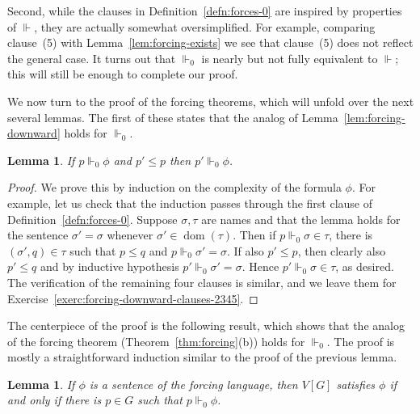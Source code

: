 \documentclass[11pt,oneside,a4paper]{amsbook}
\newcommand{\forces}{\Vdash}
\DeclareMathOperator{\dom}{dom}
\theoremstyle{definition}
\theoremstyle{plain}
\newtheorem{lemma}[theorem]{Lemma}
\theoremstyle{definition}
\theoremstyle{remark}
\numberwithin{equation}{section}
\numberwithin{figure}{section}
\begin{document}
Second, while the clauses in Definition~\ref{defn:forces-0} are inspired by properties of $\forces$, they are actually somewhat oversimplified. For example, comparing clause~(5) with Lemma~\ref{lem:forcing-exists} we see that clause~(5) does not reflect the general case. It turns out that $\forces_0$ is nearly but not fully equivalent to $\forces$; this will still be enough to complete our proof.


We now turn to the proof of the forcing theorems, which will unfold over the next several lemmas. The first of these states that the analog of Lemma~\ref{lem:forcing-downward} holds for $\forces_0$.

\begin{lemma}
  \label{lem:forcing-downward-0}
  If $p\forces_0\phi$ and $p'\leq p$ then $p'\forces_0\phi$.
\end{lemma}

\begin{proof}
  We prove this by induction on the complexity of the formula $\phi$. For example, let us check that the induction passes through the first clause of Definition~\ref{defn:forces-0}. Suppose $\sigma,\tau$ are names and that the lemma holds for the sentence $\sigma'=\sigma$ whenever $\sigma'\in\dom(\tau)$. Then if $p\forces_0\sigma\in\tau$, there is $(\sigma',q)\in\tau$ such that $p\leq q$ and $p\forces_0\sigma'=\sigma$. If also $p'\leq p$, then clearly also $p'\leq q$ and by inductive hypothesis $p'\forces_0\sigma'=\sigma$. Hence $p'\forces_0\sigma\in\tau$, as desired. The verification of the remaining four clauses is similar, and we leave them for Exercise~\ref{exerc:forcing-downward-clauses-2345}.
\end{proof}

The centerpiece of the proof is the following result, which shows that the analog of the forcing theorem (Theorem~\ref{thm:forcing}(b)) holds for $\forces_0$. The proof is mostly a straightforward induction similar to the proof of the previous lemma.

\begin{lemma}
  \label{lem:forcing-theorem-0}
  If $\phi$ is a sentence of the forcing language, then $V[G]$ satisfies $\phi$ if and only if there is $p\in G$ such that $p\forces_0\phi$.
\end{lemma}
\end{document}
